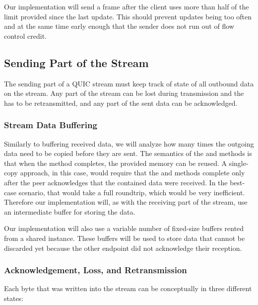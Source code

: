 Our implementation will send a \MAXSTREAMDATA{} frame after the client uses more than half of the
limit provided since the last update. This should prevent updates being too often and at the same
time early enough that the sender does not run out of flow control credit.

\subsection{Sending Part of the Stream}\label{sec:03-send-stream}

The sending part of a QUIC stream must keep track of state of all outbound data on the stream. Any
part of the stream can be lost during transmission and the has to be retransmitted, and any part of
the sent data can be acknowledged.

\subsubsection{Stream Data Buffering}

Similarly to buffering received data, we will analyze how many times the outgoing data need to be
copied before they are sent. The semantics of the  and  methods is
that when the method completes, the provided memory can be reused.  A
single-copy approach, in this case, would require that the  and 
methods complete only after the peer acknowledges that the contained data were received. In the
best-case scenario, that would take a full roundtrip, which would be very inefficient. Therefore our
implementation will, as with the receiving part of the stream, use an intermediate buffer for
storing the data.

Our implementation will also use a variable number of fixed-size buffers rented from a shared
\ArrayPoolOf{\Byte{}} instance. These buffers will be used to store data that cannot be discarded
yet because the other endpoint did not acknowledge their reception.

\subsubsection{Acknowledgement, Loss, and Retransmission}

Each byte that was written into the stream can be conceptually in three different states:

